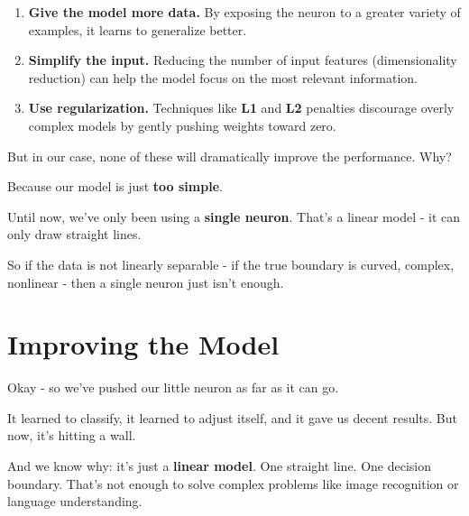 \documentclass[11pt]{article}
\begin{document}
\begin{enumerate}
    \item \textbf{Give the model more data.}  
    By exposing the neuron to a greater variety of examples, it learns to generalize better.

    \item \textbf{Simplify the input.}  
    Reducing the number of input features (dimensionality reduction) can help the model focus on the most relevant information.

    \item \textbf{Use regularization.}  
    Techniques like \textbf{L1} and \textbf{L2} penalties discourage overly complex models by gently pushing weights toward zero.
\end{enumerate}

\vspace{1em}

But in our case, none of these will dramatically improve the performance.  
Why?

\vspace{0.5em}

Because our model is just \textbf{too simple}.

\vspace{1em}

\begin{tcolorbox}[colback=white!98!gray, colframe=gray!30!black, arc=1mm]
Until now, we've only been using a \textbf{single neuron}.  
That's a linear model - it can only draw straight lines.
\end{tcolorbox}

\vspace{0.5em}

So if the data is not linearly separable - if the true boundary is curved, complex, nonlinear -  
then a single neuron just isn't enough.

\vspace{1em}

\section*{Improving the Model}

Okay - so we've pushed our little neuron as far as it can go.

It learned to classify, it learned to adjust itself, and it gave us decent results.  
But now, it's hitting a wall.

And we know why: it's just a \textbf{linear model}. One straight line. One decision boundary.  
That's not enough to solve complex problems like image recognition or language understanding.
\end{document}

